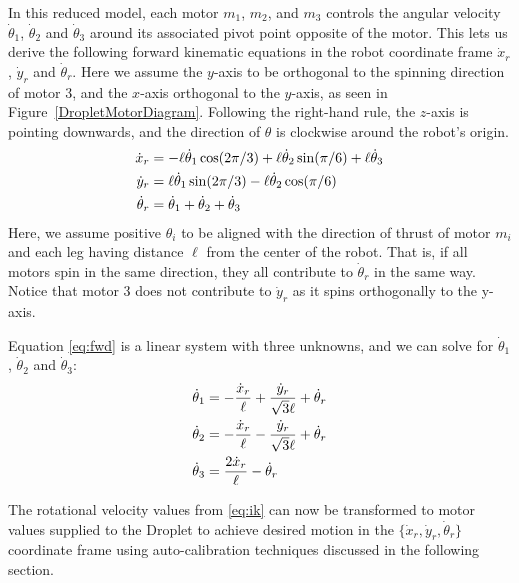 \documentclass[letterpaper, 10pt, conference]{ieeeconf}
\begin{document}
In this reduced model, each motor $m_1$, $m_2$, and $m_3$ controls the angular velocity $\dot{\theta}_1$, $\dot{\theta}_2$ and $\dot{\theta}_3$ around its associated pivot point opposite of the motor. This lets us derive the following forward kinematic equations in the robot coordinate frame $\dot{x}_r$, $\dot{y}_r$ and $\dot{\theta}_r$.
Here we assume the $y$-axis to be orthogonal to the spinning direction of motor 3, and the $x$-axis orthogonal to the $y$-axis, as seen in Figure~\ref{DropletMotorDiagram}. Following the right-hand rule, the $z$-axis is pointing downwards, and the direction of $\theta$ is clockwise around the robot's origin.
\begin{align}\label{eq:fwd}
\dot{x}_r &= -\ell \dot{\theta}_1 \cos(2 \pi / 3) + \ell \dot{\theta}_2 \sin(\pi / 6) + \ell \dot{\theta}_3\notag\\
\dot{y}_r &=  \ell \dot{\theta}_1 \sin(2 \pi / 3) - \ell \dot{\theta}_2 \cos(\pi / 6)\\
\dot{\theta}_r &= \dot{\theta}_1 + \dot{\theta}_2 + \dot{\theta}_3\notag
\end{align}
Here, we assume positive $\theta_i$ to be aligned with the direction of thrust of motor $m_i$ and each leg having distance $\ell$ from the center of the robot. That is, if all motors spin in the same direction, they all contribute to $\dot{\theta}_r$ in the same way. Notice that motor 3 does not contribute to $\dot{y}_r$ as it spins orthogonally to the y-axis.

Equation \ref{eq:fwd} is a linear system with three unknowns, and we can solve for $\dot{\theta}_1$, $\dot{\theta}_2$ and $\dot{\theta}_3$:
\begin{align}\label{eq:ik}
\dot{\theta}_1 & = -\frac{\dot{x}_r}{\ell} + \frac{\dot{y}_r}{\sqrt{3}\ell} + \dot{\theta}_r\notag\\
\dot{\theta}_2 & = -\frac{\dot{x}_r}{\ell} - \frac{\dot{y}_r}{\sqrt{3}\ell} + \dot{\theta}_r\\
\dot{\theta}_3 & = \frac{2 \dot{x}_r}{\ell} - \dot{\theta}_r\notag
\end{align}

The rotational velocity values from \eqref{eq:ik} can now be transformed to motor values supplied to the Droplet to achieve desired motion in the $\{\dot{x}_r, \dot{y}_r, \dot{\theta}_r\}$ coordinate frame using auto-calibration techniques discussed in the following section.




\end{document}

